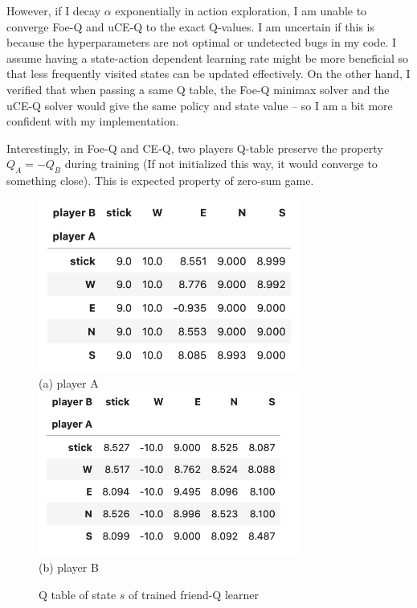 \documentclass[conference]{IEEEtran}
\begin{document}
However, if I decay $\alpha$ exponentially in action exploration, I am unable to converge Foe-Q and uCE-Q to the exact Q-values. I am uncertain if this is because the hyperparameters are not optimal or undetected bugs in my code. I assume having a state-action dependent learning rate might be more beneficial so that less frequently visited states can be updated effectively. On the other hand, I verified that when passing a same Q table, the Foe-Q minimax solver and the uCE-Q solver would give the same policy and state value -- so I am a bit more confident with my implementation.

Interestingly, in Foe-Q and CE-Q, two players Q-table preserve the property $Q_A = -Q_B$ during training (If not initialized this way, it would converge to something close). This is expected property of zero-sum game. 

\begin{figure}
	\centering
	\includegraphics[width=3.4in]{figures/FriendQ_A.png}\\
	(a) player A\\
	\includegraphics[width=3.4in]{figures/FriendQ_B.png}\\
	(b) player B
	\caption{Q table of state $s$ of trained friend-Q learner}
	\label{fig:friendQ}
\end{figure}
\end{document}
